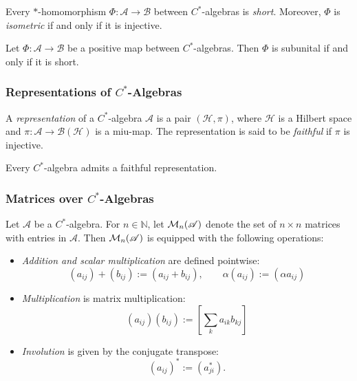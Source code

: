 \begin{proposition} \cite[Theorem 1.5.7]{pedersenCalgebrasTheirAutomorphism1979} \label{prop:HomShortIsoIso}
  Every \(*\)-homomorphism \( \Phi: \mathscr{A} \to \mathscr{B} \) between \( C^* \)-algebras is \emph{short}. Moreover, \( \Phi \) is \emph{isometric} if and only if it is injective.
\end{proposition}

\begin{proposition} \cite[Proposition 2.4]{choSemanticsQuantumProgramming2016} \label{prop:subunital_short}
Let \( \Phi: \mathscr{A} \to \mathscr{B} \) be a positive map between \( C^* \)-algebras. Then \( \Phi \) is subunital if and only if it is short.
\end{proposition}


\subsubsection{Representations of $C^*$-Algebras}

\begin{definition}
  A \emph{representation} of a \( C^* \)-algebra \(  \mathscr{A} \) is a pair \( (\mathcal{H}, \pi) \), where \( \mathcal{H} \) is a Hilbert space and \( \pi:  \mathscr{A} \to \mathcal{B}(\mathcal{H}) \) is a miu-map. The representation is said to be \emph{faithful} if \( \pi \) is injective. 
\end{definition}

\begin{theorem} \cite[Theorem 9.18.]{takesakiTheoryOperatorAlgebras1979}
  Every $C^*$-algebra admits a faithful representation.
\end{theorem}

\subsubsection{Matrices over $C^*$-Algebras}

\begin{definition}
  Let \( \mathscr{A} \) be a \(C^*\)-algebra. For \( n \in \mathbb{N} \), let \( \mathcal{M}_{n}(\mathscr{A} )\) denote the set of \( n \times n \) matrices with entries in \( \mathscr{A} \). Then \( \mathcal{M}_{n}(\mathscr{A} )\) is equipped with the following operations:

\begin{itemize}
    \item \emph{Addition and scalar multiplication} are defined pointwise:
    \[
    (a_{ij}) + (b_{ij}) := (a_{ij} + b_{ij}), \qquad
    \alpha (a_{ij}) := (\alpha a_{ij})
    \]
    
    \item \emph{Multiplication} is matrix multiplication:
    \[
    (a_{ij}) (b_{ij}) := \left[ \sum_k a_{ik} b_{kj} \right]
    \]
    
    \item \emph{Involution} is given by the conjugate transpose:
    \[
    (a_{ij})^* := (a_{ji}^*).
    \]
\end{itemize}
\end{definition}

